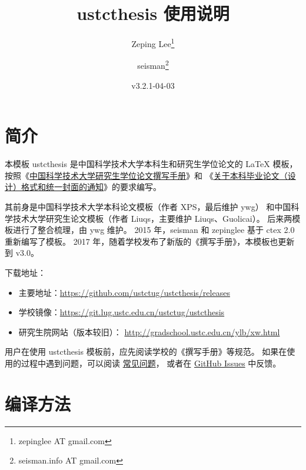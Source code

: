 \documentclass[a4paper]{ltxdoc}
\DeclareRobustCommand\pkg{\textsf}
\DeclareRobustCommand\cls{\textsf}
\begin{document}
\title{\cls{ustcthesis} 使用说明}
\author{Zeping Lee\thanks{zepinglee AT gmail.com} \and
        seisman\thanks{seisman.info AT gmail.com} }
\date{v3.2.1-04-03}
\maketitle



\section{简介}

本模板 \cls{ustcthesis} 是中国科学技术大学本科生和研究生学位论文的 \LaTeX{}
模板， 按照《\href{http://gradschool.ustc.edu.cn/ylb/material/xw/wdxz/32.pdf}
{中国科学技术大学研究生学位论文撰写手册}》和
《\href{https://www.teach.ustc.edu.cn/notice/notice-teaching/11530.html}
{关于本科毕业论文（设计）格式和统一封面的通知}》的要求编写。

其前身是中国科学技术大学本科论文模板（作者 XPS，最后维护 ywg）
和中国科学技术大学研究生论文模板（作者 Liuqs，主要维护 Liuqs、Guolicai）。
后来两模板进行了整合梳理，由 ywg 维护。
2015 年，seisman 和 zepinglee 基于 \pkg{ctex} 2.0 重新编写了模板。
2017 年，随着学校发布了新版的《撰写手册》，本模板也更新到 v3.0。

下载地址：
\begin{itemize}
  \item 主要地址：\url{https://github.com/ustctug/ustcthesis/releases}
  \item 学校镜像：\url{https://git.lug.ustc.edu.cn/ustctug/ustcthesis}
  \item 研究生院网站（版本较旧）：
    \url{http://gradschool.ustc.edu.cn/ylb/xw.html}
\end{itemize}

用户在使用 \pkg{ustcthesis} 模板前，应先阅读学校的《撰写手册》等规范。
如果在使用的过程中遇到问题，可以阅读
\href{https://github.com/ustctug/ustcthesis/wiki}{常见问题}，
或者在 \href{https://github.com/ustctug/ustcthesis/issues}{GitHub Issues}
中反馈。



\section{编译方法}
\end{document}
